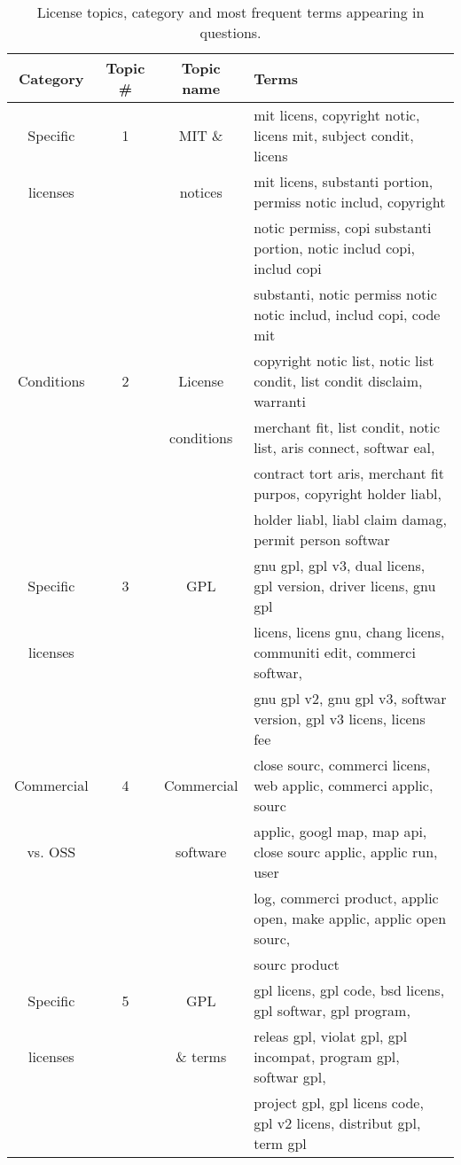 \begin{table}
  \caption{License topics, category and most frequent terms appearing in questions.}
  \label{tab:qa-topics}
  \begin{adjustbox}{width=0.99\textwidth}
  \begin{tabular}{cccl}
  \hline
    \textbf{Category} & \textbf{Topic \#} & \textbf{Topic name} & \textbf{Terms}\\
    \hline
Specific & 1& MIT \& &
mit licens, 
copyright notic, 
licens mit, 
subject condit, licens\\

licenses && notices & 
mit licens, 
substanti portion, 
permiss notic includ, copyright\\
&&& notic permiss, 
copi substanti portion, 
notic includ copi, includ copi\\
&&& substanti, 
notic permiss notic
notic includ, 
includ copi, 
code mit
\\

\hline
Conditions & 2& License &
copyright notic list, 
notic list condit, 
list condit disclaim, 
warranti
\\

&& conditions &
merchant fit, 
list condit, 
notic list, 
aris connect, 
softwar eal, \\
&&&
contract tort aris, 
merchant fit purpos, 
copyright holder liabl, 
\\
&&&holder liabl, 
liabl claim damag,
permit person softwar
\\

\hline
Specific & 3& GPL &
gnu gpl, 
gpl v3, 
dual licens, 
gpl version, 
driver licens, 
gnu gpl  \\
licenses&&&
licens,
licens gnu, 
chang licens, 
communiti edit, 
commerci softwar, \\
&&&gnu gpl v2, 
gnu gpl v3, 
softwar version, 
gpl v3 licens, 
licens fee
\\

\hline
Commercial& 4& Commercial &
close sourc, 
commerci licens, 
web applic, 
commerci applic, sourc \\
vs. OSS&&software &
 applic,
googl map, 
map api, 
close sourc applic, 
applic run, user
 \\
&&&
log,
commerci product, 
applic open, 
make applic, 
applic open sourc, \\
&&&
sourc product
\\

\hline
Specific& 5& GPL & 
gpl licens, 
gpl code, 
bsd licens, 
gpl softwar, 
gpl program, \\
licenses&&\& terms&
releas gpl, 
violat gpl, 
gpl incompat, 
program gpl, 
softwar gpl, \\
&&&project gpl, 
gpl licens code, 
gpl v2 licens, 
distribut gpl, 
term gpl
\\


\end{tabular}
\end{adjustbox}
\end{table}
